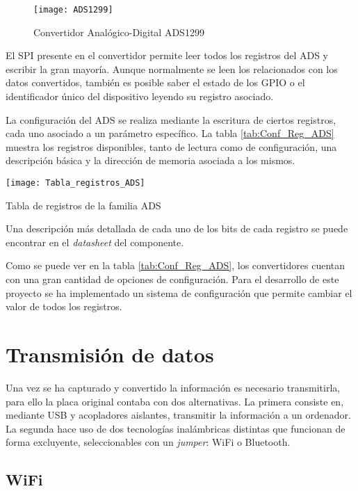 \begin{figure} [h]
    \centering
    \texttt{[image: ADS1299]}
    \caption{Convertidor Analógico-Digital ADS1299}
    \label{fig:ADS1299}
\end{figure}

El \Gls{SPI} presente en el convertidor permite leer todos los registros del ADS y escribir la gran mayoría. Aunque normalmente se leen los relacionados con los datos convertidos, también es posible saber el estado de los \Gls{GPIO} o el identificador único del dispositivo leyendo su registro asociado.

La configuración del ADS se realiza mediante la escritura de ciertos registros, cada uno asociado a un parámetro específico. La tabla \ref{tab:Conf_Reg_ADS} muestra los registros disponibles, tanto de lectura como de configuración, una descripción básica y la dirección de memoria asociada a los mismos.

\begin{table} [h]
    \centering
    \texttt{[image: Tabla\_registros\_ADS]}
    \caption{Tabla de registros de la familia ADS}
    \label{tab:Conf_Reg_ADS}
\end{table}

Una descripción más detallada de cada uno de los bits de cada registro se puede encontrar en el \textit{datasheet} del componente.

Como se puede ver en la tabla \ref{tab:Conf_Reg_ADS}, los convertidores cuentan con una gran cantidad de opciones de configuración. Para el desarrollo de este proyecto se ha implementado un sistema de configuración que permite cambiar el valor de todos los registros.

\section{Transmisión de datos\label{sec:Transmisión_N}}

Una vez se ha capturado y convertido la información es necesario transmitirla, para ello la placa original contaba con dos alternativas. La primera consiste en, mediante \Gls{USB} y acopladores aislantes, transmitir la información a un ordenador. 
\\La segunda hace uso de dos tecnologías inalámbricas distintas que funcionan de forma excluyente, seleccionables con un \textit{jumper}: WiFi o Bluetooth.

\subsection{WiFi\label{sec:WiFi_N}}

